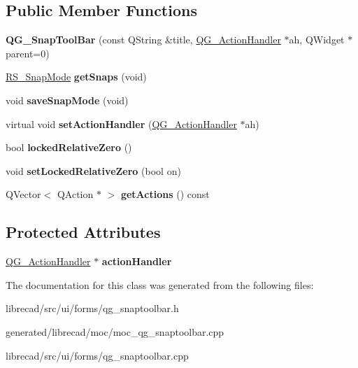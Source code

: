 \subsection*{Public Member Functions}
\begin{DoxyCompactItemize}
\item 
\hypertarget{classQG__SnapToolBar_a967a984e1fca83ae9ecafb79948e4d57}{{\bfseries Q\-G\-\_\-\-Snap\-Tool\-Bar} (const Q\-String \&title, \hyperlink{classQG__ActionHandler}{Q\-G\-\_\-\-Action\-Handler} $\ast$ah, Q\-Widget $\ast$parent=0)}\label{classQG__SnapToolBar_a967a984e1fca83ae9ecafb79948e4d57}

\item 
\hypertarget{classQG__SnapToolBar_a8fb339c51152c742cc65c91abc9a3682}{\hyperlink{structRS__SnapMode}{R\-S\-\_\-\-Snap\-Mode} {\bfseries get\-Snaps} (void)}\label{classQG__SnapToolBar_a8fb339c51152c742cc65c91abc9a3682}

\item 
\hypertarget{classQG__SnapToolBar_aa670f20c3e39533e06c20dfe71406ac3}{void {\bfseries save\-Snap\-Mode} (void)}\label{classQG__SnapToolBar_aa670f20c3e39533e06c20dfe71406ac3}

\item 
\hypertarget{classQG__SnapToolBar_ada06f89175ebfd3b816f7f98b5a1c583}{virtual void {\bfseries set\-Action\-Handler} (\hyperlink{classQG__ActionHandler}{Q\-G\-\_\-\-Action\-Handler} $\ast$ah)}\label{classQG__SnapToolBar_ada06f89175ebfd3b816f7f98b5a1c583}

\item 
\hypertarget{classQG__SnapToolBar_a389d4f4d2ab21a3c20fa37ed2b45912e}{bool {\bfseries locked\-Relative\-Zero} ()}\label{classQG__SnapToolBar_a389d4f4d2ab21a3c20fa37ed2b45912e}

\item 
\hypertarget{classQG__SnapToolBar_a363f1da601343981d4ba83c822d013c6}{void {\bfseries set\-Locked\-Relative\-Zero} (bool on)}\label{classQG__SnapToolBar_a363f1da601343981d4ba83c822d013c6}

\item 
\hypertarget{classQG__SnapToolBar_a9ccfc4c705a59f1ba667b69b42ce6952}{Q\-Vector$<$ Q\-Action $\ast$ $>$ {\bfseries get\-Actions} () const }\label{classQG__SnapToolBar_a9ccfc4c705a59f1ba667b69b42ce6952}

\end{DoxyCompactItemize}
\subsection*{Protected Attributes}
\begin{DoxyCompactItemize}
\item 
\hypertarget{classQG__SnapToolBar_adb7d9eedbebfcfe4079216f40ac90c39}{\hyperlink{classQG__ActionHandler}{Q\-G\-\_\-\-Action\-Handler} $\ast$ {\bfseries action\-Handler}}\label{classQG__SnapToolBar_adb7d9eedbebfcfe4079216f40ac90c39}

\end{DoxyCompactItemize}


The documentation for this class was generated from the following files\-:\begin{DoxyCompactItemize}
\item 
librecad/src/ui/forms/qg\-\_\-snaptoolbar.\-h\item 
generated/librecad/moc/moc\-\_\-qg\-\_\-snaptoolbar.\-cpp\item 
librecad/src/ui/forms/qg\-\_\-snaptoolbar.\-cpp\end{DoxyCompactItemize}

